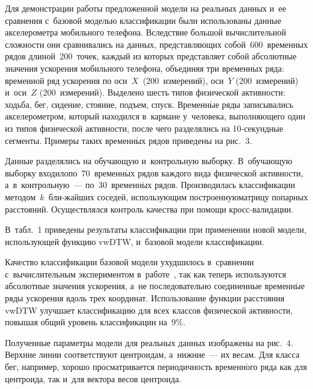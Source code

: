 \begin{multicols}{2}
Для демонстрации работы предложенной модели на реальных данных и~ее сравнения 
с~базовой моделью классификации были использованы данные акселерометра 
мобильного телефона. Вследствие большой вычислительной сложности они 
сравнивались на данных, представляющих 
собой~600~временн$\acute{\mbox{ы}}$х рядов длиной~200~точек, каж\-дый из которых 
представляет собой абсолютные значения ускорения мобильного телефона, 
объединяя три временн$\acute{\mbox{ы}}$х ряда: временной ряд ускорения 
по оси~$X$~(200~измерений), оси~$Y$ (200~измерений) и~оси~$Z$ (200~измерений). 
Выделено шесть типов физической активности: ходьба, бег, сидение, стояние, 
подъем, спуск. Временн$\acute{\mbox{ы}}$е ряды записывались акселерометром, 
который находился в~кармане у~человека, выполняющего один из типов физической 
активности, после чего разделялись на 10-се\-кунд\-ные сегменты. Примеры таких 
временн$\acute{\mbox{ы}}$х рядов приведены на рис.~3.

 
Данные разделялись на обучающую и~контрольную выборку. 
В~обучающую выборку входило\linebreak по~70~временн$\acute{\mbox{ы}}$х рядов каждого вида физической активности, 
а~в~контрольную~--- по~30~вре\-мен\-н$\acute{\mbox{ы}}$х рядов. Производилась 
классификации ме\-то\-дом~$k$~бли-\linebreak жайших 
соседей, использующим построенную\linebreak мат\-ри\-цу попарных расстояний. Осуществлялся контроль 
качества при помощи кросс-ва\-ли\-да\-ции.  

В~табл.~1 приведены результаты 
классификации при применении новой модели, использующей функцию vwDTW, 
и~базовой модели классификации.

Качество классификации базовой модели ухудшилось в~сравнении с~вычислительным 
экспериментом в~работе~\cite{Goncharov}, так как теперь используются абсолютные 
значения ускорения, а~не последовательно соединенные временн$\acute{\mbox{ы}}$е ряды ускорения вдоль 
трех координат. Использование функции расстояния vwDTW улучшает классификацию для 
всех классов физической активности, повышая общий уровень классификации на~9\%.



Полученные параметры модели для реальных данных изображены на рис.~4.
Верхние линии соответствуют центроидам, а~нижние~--- их весам. 
Для класса бег, например, хорошо просматривается периодичность временн$\acute{\mbox{о}}$го ряда как 
для центроида, так и~для вектора весов центроида.

\begin{figure*} %
\vspace*{1pt}
 \begin{center}
 \mbox{%
 \epsfxsize=162.61mm
 }
 \end{center}
 \vspace*{-9pt}
\end{figure*}


\end{multicols}
